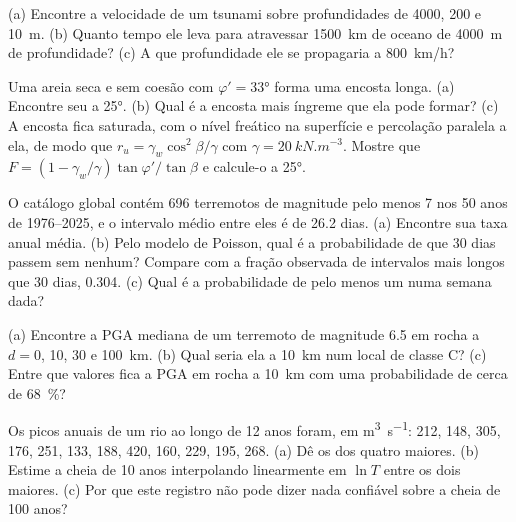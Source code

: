 \begin{exercise}[$\star$]\label{exo:b2:geological-hazards:3}
(a) Encontre a velocidade de um tsunami sobre profundidades de 4000, 200 e \qty{10}{m}. (b) Quanto tempo ele leva
para atravessar \qty{1500}{km} de oceano de \qty{4000}{m} de profundidade? (c) A que profundidade ele se propagaria a
\qty{800}{km/h}?
\end{exercise}

\begin{exercise}[$\star$]\label{exo:b2:geological-hazards:4}
Uma areia seca e sem coesão com $\varphi' = \ang{33}$ forma uma encosta longa. (a) Encontre seu  a \ang{25}. (b) Qual é a encosta mais íngreme que ela pode formar? (c) A encosta fica saturada, com
o nível freático na superfície e percolação paralela a ela, de modo que $r_u = \gamma_w\cos^2\beta/\gamma$
com $\gamma = \qty{20}{kN.m^{-3}}$. Mostre que $F = (1 - \gamma_w/\gamma)\tan\varphi'/\tan\beta$ e
calcule-o a \ang{25}.
\end{exercise}

\begin{exercise}[$\star\star$]\label{exo:b2:geological-hazards:5}
O catálogo global contém 696 terremotos de magnitude pelo menos 7 nos 50 anos de 1976--2025, e
o intervalo médio entre eles é de 26.2 dias. (a) Encontre sua taxa anual média. (b) Pelo modelo de
Poisson, qual é a probabilidade de que 30 dias passem sem nenhum? Compare com a fração observada
de intervalos mais longos que 30 dias, 0.304. (c) Qual é a probabilidade de pelo menos um numa
semana dada?
\end{exercise}

\begin{exercise}[$\star\star$]\label{exo:b2:geological-hazards:6}
(a) Encontre a PGA mediana de um terremoto de magnitude 6.5 em rocha a $d = 0$, 10, 30 e
\qty{100}{km}. (b) Qual seria ela a \qty{10}{km} num local de classe C? (c) Entre que valores
fica a PGA em rocha a \qty{10}{km} com uma probabilidade de cerca de \qty{68}{\percent}?
\end{exercise}

\begin{exercise}[$\star\star$]\label{exo:b2:geological-hazards:7}
Os picos anuais de um rio ao longo de 12 anos foram, em \unit{m^3.s^{-1}}: 212, 148, 305, 176, 251, 133, 188,
420, 160, 229, 195, 268. (a) Dê os  dos quatro maiores. (b) Estime a cheia de 10
anos interpolando linearmente em $\ln T$ entre os dois maiores. (c) Por que este registro não pode dizer
nada confiável sobre a cheia de 100 anos?
\end{exercise}

